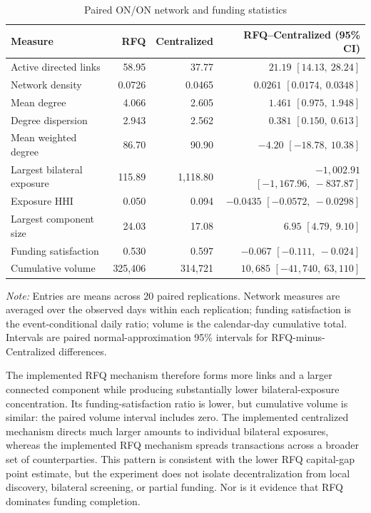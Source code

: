 \begin{table}[htbp]
\centering
\caption{Paired ON/ON network and funding statistics}
\label{tab:network-results}
\small
\begin{tabular}{@{}lrrr@{}}
\toprule
\textbf{Measure} & \textbf{RFQ} & \textbf{Centralized} & \textbf{RFQ--Centralized (95\% CI)}\\
\midrule
Active directed links & 58.95 & 37.77 & $21.19$ $[14.13,\ 28.24]$\\
Network density & 0.0726 & 0.0465 & $0.0261$ $[0.0174,\ 0.0348]$\\
Mean degree & 4.066 & 2.605 & $1.461$ $[0.975,\ 1.948]$\\
Degree dispersion & 2.943 & 2.562 & $0.381$ $[0.150,\ 0.613]$\\
Mean weighted degree & 86.70 & 90.90 & $-4.20$ $[-18.78,\ 10.38]$\\
Largest bilateral exposure & 115.89 & 1,118.80 & $-1{,}002.91$ $[-1{,}167.96,\ -837.87]$\\
Exposure HHI & 0.050 & 0.094 & $-0.0435$ $[-0.0572,\ -0.0298]$\\
Largest component size & 24.03 & 17.08 & $6.95$ $[4.79,\ 9.10]$\\
Funding satisfaction & 0.530 & 0.597 & $-0.067$ $[-0.111,\ -0.024]$\\
Cumulative volume & 325,406 & 314,721 & $10{,}685$ $[-41{,}740,\ 63{,}110]$\\
\bottomrule
\end{tabular}
\begin{minipage}{0.96\textwidth}
\footnotesize
\textit{Note:} Entries are means across 20 paired replications. Network
measures are averaged over the observed days within each replication;
funding satisfaction is the event-conditional daily ratio; volume is the
calendar-day cumulative total. Intervals are paired normal-approximation
95\% intervals for RFQ-minus-Centralized differences.
\end{minipage}
\end{table}

The implemented RFQ mechanism therefore forms more links and a larger
connected component while
producing substantially lower bilateral-exposure concentration. Its
funding-satisfaction ratio is lower, but cumulative volume is similar:
the paired volume interval includes zero. The implemented centralized
mechanism directs much larger amounts to individual bilateral exposures,
whereas the implemented RFQ mechanism spreads transactions across a broader
set of counterparties. This pattern is consistent with the lower RFQ
capital-gap point estimate, but the experiment does not isolate
decentralization from local discovery, bilateral screening, or partial
funding. Nor is it evidence that RFQ dominates funding completion.

